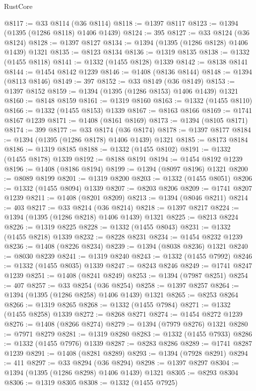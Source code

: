 \begin{lexlean}{RustCore}
\begin{coremodule}
@8117 := @33 @8114 (@36 @8114)
@8118 := @1397 @8117
@8123 := @1394 (@1395 (@1286 @8118) @1406 @1439)
@8124 := 395
@8127 := @33 @8124 (@36 @8124)
@8128 := @1397 @8127
@8134 := @1394 (@1395 (@1286 @8128) @1406 @1439) @1321
@8135 := @8123 @8134
@8136 := @1319 @8135
@8138 := @1332 (@1455 @8118)
@8141 := @1332 (@1455 @8128) @1339
@8142 := @8138 @8141
@8144 := @1454 @8142 @1239
@8146 := @1408 (@8136 @8144)
@8148 := @1394 (@8113 @8146)
@8149 := 397
@8152 := @33 @8149 (@36 @8149)
@8153 := @1397 @8152
@8159 := @1394 (@1395 (@1286 @8153) @1406 @1439) @1321
@8160 := @8148 @8159
@8161 := @1319 @8160
@8163 := @1332 (@1455 @8110)
@8166 := @1332 (@1455 @8153) @1339
@8167 := @8163 @8166
@8169 := @1741 @8167 @1239
@8171 := @1408 (@8161 @8169)
@8173 := @1394 (@8105 @8171)
@8174 := 399
@8177 := @33 @8174 (@36 @8174)
@8178 := @1397 @8177
@8184 := @1394 (@1395 (@1286 @8178) @1406 @1439) @1321
@8185 := @8173 @8184
@8186 := @1319 @8185
@8188 := @1332 (@1455 @8102)
@8191 := @1332 (@1455 @8178) @1339
@8192 := @8188 @8191
@8194 := @1454 @8192 @1239
@8196 := @1408 (@8186 @8194)
@8199 := @1394 (@8097 @8196) @1321
@8200 := @8089 @8199
@8201 := @1319 @8200
@8203 := @1332 (@1455 @8051)
@8206 := @1332 (@1455 @8094) @1339
@8207 := @8203 @8206
@8209 := @1741 @8207 @1239
@8211 := @1408 (@8201 @8209)
@8213 := @1394 (@8046 @8211)
@8214 := 403
@8217 := @33 @8214 (@36 @8214)
@8218 := @1397 @8217
@8224 := @1394 (@1395 (@1286 @8218) @1406 @1439) @1321
@8225 := @8213 @8224
@8226 := @1319 @8225
@8228 := @1332 (@1455 @8043)
@8231 := @1332 (@1455 @8218) @1339
@8232 := @8228 @8231
@8234 := @1454 @8232 @1239
@8236 := @1408 (@8226 @8234)
@8239 := @1394 (@8038 @8236) @1321
@8240 := @8030 @8239
@8241 := @1319 @8240
@8243 := @1332 (@1455 @7992)
@8246 := @1332 (@1455 @8035) @1339
@8247 := @8243 @8246
@8249 := @1741 @8247 @1239
@8251 := @1408 (@8241 @8249)
@8253 := @1394 (@7987 @8251)
@8254 := 407
@8257 := @33 @8254 (@36 @8254)
@8258 := @1397 @8257
@8264 := @1394 (@1395 (@1286 @8258) @1406 @1439) @1321
@8265 := @8253 @8264
@8266 := @1319 @8265
@8268 := @1332 (@1455 @7984)
@8271 := @1332 (@1455 @8258) @1339
@8272 := @8268 @8271
@8274 := @1454 @8272 @1239
@8276 := @1408 (@8266 @8274)
@8279 := @1394 (@7979 @8276) @1321
@8280 := @7971 @8279
@8281 := @1319 @8280
@8283 := @1332 (@1455 @7933)
@8286 := @1332 (@1455 @7976) @1339
@8287 := @8283 @8286
@8289 := @1741 @8287 @1239
@8291 := @1408 (@8281 @8289)
@8293 := @1394 (@7928 @8291)
@8294 := 411
@8297 := @33 @8294 (@36 @8294)
@8298 := @1397 @8297
@8304 := @1394 (@1395 (@1286 @8298) @1406 @1439) @1321
@8305 := @8293 @8304
@8306 := @1319 @8305
@8308 := @1332 (@1455 @7925)

\end{coremodule}
\end{lexlean}
